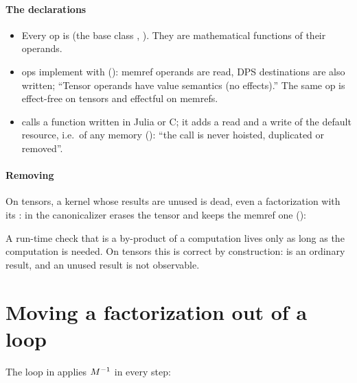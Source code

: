 \paragraph{The declarations}
\begin{itemize}
\item Every  op is  (the base class
  , ). They
  are mathematical functions of their operands.
\item {} ops implement  with
   (): memref
  operands are read, DPS destinations are also written; ``Tensor operands
  have value semantics (no effects).'' The same op is effect-free on tensors
  and effectful on memrefs.
\item {} calls a function written in Julia or C; it adds
  a read and a write of the default resource, i.e.\ of any memory
  (): ``the call is never
  hoisted, duplicated or removed''.
\end{itemize}

\paragraph{Removing} On tensors, a kernel whose results are unused is dead,
even a factorization with its : in 
the canonicalizer erases the tensor  and keeps the memref one
():


A run-time check that is a by-product of a computation lives only as long
as the computation is needed. On tensors this is correct by construction:
 is an ordinary result, and an unused result is not observable.

\section{Moving a factorization out of a loop}
\label{sec:effects-licm}

The loop in  applies \(M^{-1}\) in every step:


